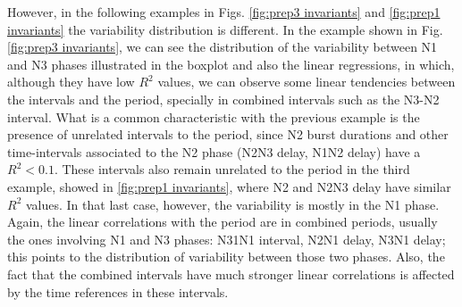 However, in the following examples in Figs. \ref{fig:prep3 invariants} and \ref{fig:prep1 invariants} the variability distribution is different. In the example shown in Fig. \ref{fig:prep3 invariants}, we can see the distribution of the variability between N1 and N3 phases illustrated in the boxplot and also the linear regressions, in which, although they have low $R^2$ values, we can observe some linear tendencies between the intervals and the period, specially in combined intervals such as the N3-N2 interval. What is a common characteristic with the previous example is the presence of unrelated intervals to the period, since N2 burst durations and other time-intervals associated to the N2 phase (N2N3 delay, N1N2 delay) have a $R^2 < 0.1$. These intervals also remain unrelated to the period in the third example, showed in \ref{fig:prep1 invariants}, where N2 and N2N3 delay have similar $R^2$ values. In that last case, however, the variability is mostly in the N1 phase. Again, the linear correlations with the period are in combined periods, usually the ones involving N1 and N3 phases: N31N1 interval, N2N1 delay, N3N1 delay; this points to the distribution of variability between those two phases. Also, the fact that the combined intervals have much stronger linear correlations is affected by the time references in these intervals.




